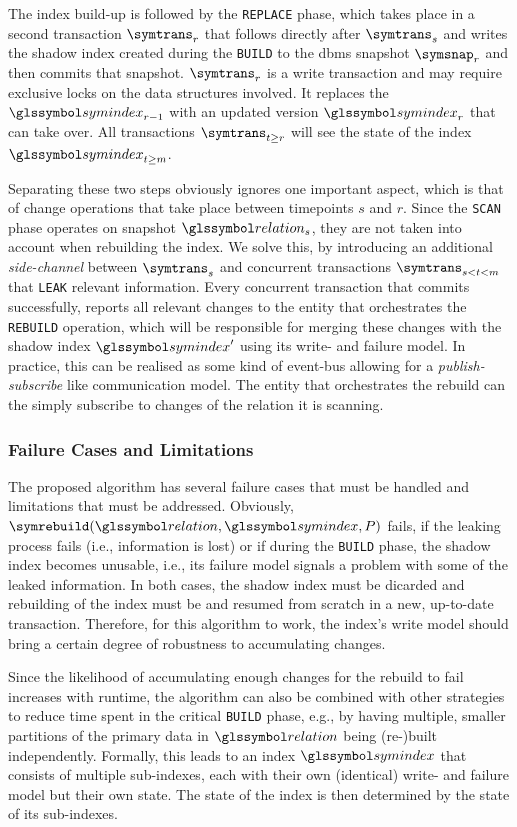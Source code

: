 The index build-up is followed by the \texttt{REPLACE} phase, which takes place in a second transaction $\symtrans_{r}$ that follows directly after $\symtrans_{s}$ and writes the shadow index created during the \texttt{BUILD} to the \acrshort{dbms} snapshot $\symsnap_r$ and then commits that snapshot. $\symtrans_{r}$ is a write transaction and may require exclusive locks on the data structures involved. It replaces the $\symindex_{r-1}$ with an updated version $\symindex_{r}$ that can take over. All transactions $\symtrans_{t \geq r}$ will see the state of the index $\symindex_{t \geq m}$. 

Separating these two steps obviously ignores one important aspect, which is that of change operations that take place between timepoints $s$ and $r$. Since the \texttt{SCAN} phase operates on snapshot $\relation_{s}$, they are not taken into account when rebuilding the index. We solve this, by introducing an additional \emph{side-channel} between $\symtrans_{s}$ and concurrent transactions $\symtrans_{s < t < m}$ that \texttt{LEAK} relevant information. Every concurrent transaction that commits successfully, reports all relevant changes to the entity that orchestrates the \texttt{REBUILD} operation, which will be responsible for merging these changes with the shadow index $\symindex^{\prime}$ using its write- and failure model. In practice, this can be realised as some kind of event-bus allowing for a \emph{publish-subscribe} like communication model. The entity that orchestrates the rebuild can the simply subscribe to changes of the relation it is scanning.

\subsubsection{Failure Cases and Limitations}

The proposed algorithm has several failure cases that must be handled and limitations that must be addressed. Obviously, $\symrebuild(\relation,\symindex,P)$ fails, if the leaking process fails (i.e., information is lost) or if during the \texttt{BUILD} phase, the shadow index becomes unusable, i.e., its failure model signals a problem with some of the leaked information. In both cases, the shadow index must be dicarded and rebuilding of the index must be and resumed from scratch in a new, up-to-date transaction. Therefore, for this algorithm to work, the index's write model should bring a certain degree of robustness to accumulating changes. 

Since the likelihood of accumulating enough changes for the rebuild to fail increases with runtime, the algorithm can also be combined with other strategies to reduce time spent in the critical \texttt{BUILD} phase, e.g., by having multiple, smaller partitions of the primary data in $\relation$ being (re-)built independently. Formally, this leads to an index $\symindex$ that consists of multiple sub-indexes, each with their own (identical) write- and failure model but their own state. The state of the index is then determined by the state of its sub-indexes.

